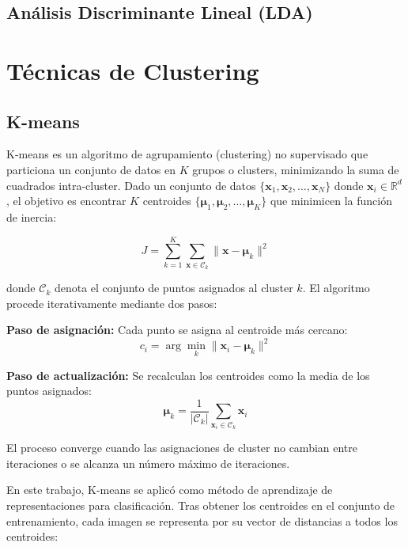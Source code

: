 \documentclass[11pt, a4paper]{article}
\begin{document}
\subsection{Análisis Discriminante Lineal (LDA)}

\section{Técnicas de Clustering}

\subsection{K-means}

K-means es un algoritmo de agrupamiento (clustering) no supervisado que particiona un conjunto de datos en $K$ grupos o clusters, minimizando la suma de cuadrados intra-cluster. Dado un conjunto de datos $\{\mathbf{x}_1, \mathbf{x}_2, \ldots, \mathbf{x}_N\}$ donde $\mathbf{x}_i \in \mathbb{R}^d$, el objetivo es encontrar $K$ centroides $\{\boldsymbol{\mu}_1, \boldsymbol{\mu}_2, \ldots, \boldsymbol{\mu}_K\}$ que minimicen la función de inercia:

\begin{equation}
J = \sum_{k=1}^{K} \sum_{\mathbf{x} \in \mathcal{C}_k} \|\mathbf{x} - \boldsymbol{\mu}_k\|^2
\end{equation}

 donde $\mathcal{C}_k$ denota el conjunto de puntos asignados al cluster $k$. El algoritmo procede iterativamente mediante dos pasos:

\textbf{Paso de asignación:} Cada punto se asigna al centroide más cercano:
\begin{equation}
c_i = \arg\min_{k} \|\mathbf{x}_i - \boldsymbol{\mu}_k\|^2
\end{equation}

\textbf{Paso de actualización:} Se recalculan los centroides como la media de los puntos asignados:
\begin{equation}
\boldsymbol{\mu}_k = \frac{1}{|\mathcal{C}_k|} \sum_{\mathbf{x}_i \in \mathcal{C}_k} \mathbf{x}_i
\end{equation}

El proceso converge cuando las asignaciones de cluster no cambian entre iteraciones o se alcanza un número máximo de iteraciones.

En este trabajo, K-means se aplicó como método de aprendizaje de representaciones para clasificación. Tras obtener los centroides en el conjunto de entrenamiento, cada imagen se representa por su vector de distancias a todos los centroides:
\end{document}
